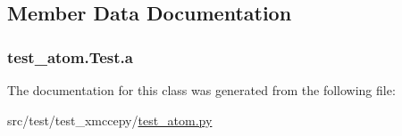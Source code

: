 \subsection{Member Data Documentation}
\hypertarget{classtest__atom_1_1_test_a6ab6843fb798ca4f1d2c6f3315204768}{
\subsubsection[{a}]{\setlength{\rightskip}{0pt plus 5cm}test\-\_\-atom.\-Test.\-a}}\label{classtest__atom_1_1_test_a6ab6843fb798ca4f1d2c6f3315204768}


The documentation for this class was generated from the following file\-:\begin{DoxyCompactItemize}
\item 
src/test/test\-\_\-xmccepy/\hyperlink{test__atom_8py}{test\-\_\-atom.\-py}\end{DoxyCompactItemize}
